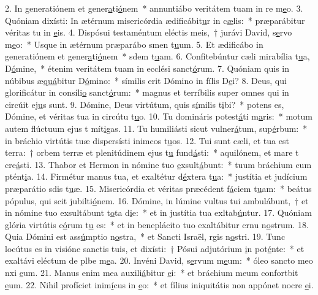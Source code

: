 2. In generatiónem et gener\uline{a}ti\uline{ó}nem~* annuntiábo veritátem tuam in re m\uline{e}o.
3. Quóniam dixísti: In ætérnum misericórdia ædificábit\uline{u}r in c\uline{æ}lis:~* præparábitur véritas tu in \uline{e}is.
4. Dispósui testaméntum eléctis meis,~† jurávi David, s\uline{e}rvo m\uline{e}o:~* Usque in ætérnum præparábo smen t\uline{u}um.
5. Et ædificábo in generatiónem et gener\uline{a}ti\uline{ó}nem~* sdem t\uline{u}am.
6. Confitebúntur cæli mirabília t\uline{u}a, D\uline{ó}mine,~* étenim veritátem tuam in ecclési sanct\uline{ó}rum.
7. Quóniam quis in núbibus æ\uline{quá}bitur D\uline{ó}mino:~* símilis erit Dómino in fílis D\uline{e}i?
8. Deus, qui glorificátur in consíli\uline{o} sanct\uline{ó}rum:~* magnus et terríbilis super omnes qui in circúit ej\uline{u}s sunt.
9. Dómine, Deus virtútum, quis s\uline{í}milis t\uline{i}bi?~* potens es, Dómine, et véritas tua in circútu t\uline{u}o.
10. Tu domináris potest\uline{á}ti m\uline{a}ris:~* motum autem flúctuum ejus t mít\uline{i}gas.
11. Tu humiliásti sicut vulner\uline{á}tum, sup\uline{é}rbum:~* in bráchio virtútis tuæ dispersísti inimcos t\uline{u}os.
12. Tui sunt cæli, et tua est terra:~† orbem terræ et plenitúdinem ejus t\uline{u} fund\uline{á}sti:~* aquilónem, et mare t cre\uline{á}sti.
13. Thabor et Hermon in nómine tuo \uline{e}xsult\uline{á}bunt:~* tuum bráchium cum ptént\uline{i}a.
14. Firmétur manus tua, et exaltétur d\uline{é}xtera t\uline{u}a:~* justítia et judícium præparátio sdis t\uline{u}æ.
15. Misericórdia et véritas præcédent f\uline{á}ciem t\uline{u}am:~* beátus pópulus, qui scit jubilti\uline{ó}nem.
16. Dómine, in lúmine vultus tui ambulábunt,~† et in nómine tuo exsultábunt t\uline{o}ta d\uline{i}e:~* et in justítia tua exltab\uline{ú}ntur.
17. Quóniam glória virtútis e\uline{ó}rum t\uline{u} es:~* et in beneplácito tuo exaltábitur crnu n\uline{o}strum.
18. Quia Dómini est ass\uline{ú}mptio n\uline{o}stra,~* et Sancti Israël, rgis n\uline{o}stri.
19. Tunc locútus es in visióne sanctis tuis, et dixísti:~† Pósui adjutórium \uline{i}n pot\uline{é}nte:~* et exaltávi eléctum de plbe m\uline{e}a.
20. Invéni David, s\uline{e}rvum m\uline{e}um:~* óleo sancto meo nxi \uline{e}um.
21. Manus enim mea auxili\uline{á}bitur \uline{e}i:~* et bráchium meum confortbit \uline{e}um.
22. Nihil profíciet inim\uline{í}cus in \uline{e}o:~* et fílius iniquitátis non appónet nocre \uline{e}i.
